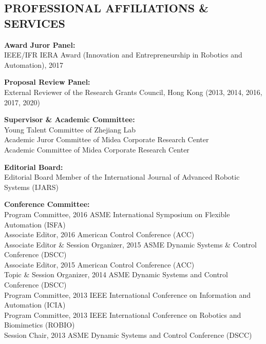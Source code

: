 \documentclass[UTF8,fontset=none]{res}
\begin{document}
\begin{resume}
\section{PROFESSIONAL AFFILIATIONS \& SERVICES}
\vspace{0.1in}

    \textbf{Award Juror Panel:}\\
    IEEE/IFR IERA Award (Innovation and Entrepreneurship in Robotics and Automation), 2017
    
    \textbf{Proposal Review Panel:}\\ %
    External Reviewer of the Research Grants Council, Hong Kong (2013, 2014, 2016, 2017, 2020)
 	
    \textbf{Supervisor \& Academic Committee:}\\
    Young Talent Committee of Zhejiang Lab\\
    Academic Juror Committee of Midea Corporate Research Center\\
    Academic Committee of Midea Corporate Research Center

    \textbf{Editorial Board:}\\ %
    Editorial Board Member of the International Journal of Advanced Robotic Systems (IJARS)

    \textbf{Conference Committee:}\\ %
    Program Committee, 2016 ASME International Symposium on Flexible Automation (ISFA)\\
    Associate Editor, 2016 American Control Conference (ACC)\\
    Associate Editor \& Session Organizer, 2015 ASME Dynamic Systems \& Control Conference (DSCC)\\
    Associate Editor, 2015 American Control Conference (ACC)\\
    Topic \& Session Organizer, 2014 ASME Dynamic Systems and Control Conference (DSCC)\\
    Program Committee, 2013 IEEE International Conference on Information and Automation (ICIA)\\
    Program Committee, 2013 IEEE International Conference on Robotics and Biomimetics (ROBIO)\\
    Session Chair, 2013 ASME Dynamic Systems and Control Conference (DSCC) %


\end{resume}
\end{document}
